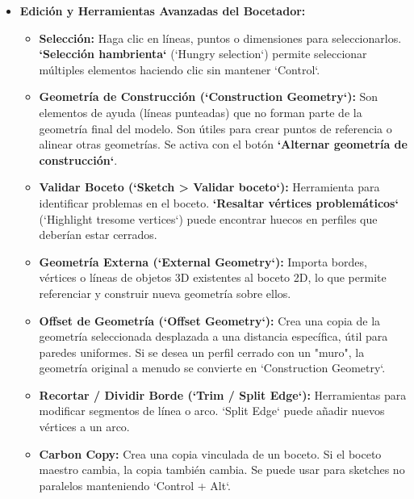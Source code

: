 \documentclass[12pt]{article}
\begin{document}
\begin{itemize}[label=\textbullet]

    \item \textbf{Edición y Herramientas Avanzadas del Bocetador:}
    \begin{itemize}[label=\textendash]
        \item \textbf{Selección:} Haga clic en líneas, puntos o dimensiones para seleccionarlos. \textbf{`Selección hambrienta`} (`Hungry selection`) permite seleccionar múltiples elementos haciendo clic sin mantener `Control`.
        \item \textbf{Geometría de Construcción (`Construction Geometry`):} Son elementos de ayuda (líneas punteadas) que no forman parte de la geometría final del modelo. Son útiles para crear puntos de referencia o alinear otras geometrías. Se activa con el botón \textbf{`Alternar geometría de construcción`}.
        \item \textbf{Validar Boceto (`Sketch > Validar boceto`):} Herramienta para identificar problemas en el boceto. \textbf{`Resaltar vértices problemáticos`} (`Highlight tresome vertices`) puede encontrar huecos en perfiles que deberían estar cerrados.
        \item \textbf{Geometría Externa (`External Geometry`):} Importa bordes, vértices o líneas de objetos 3D existentes al boceto 2D, lo que permite referenciar y construir nueva geometría sobre ellos.
        \item \textbf{Offset de Geometría (`Offset Geometry`):} Crea una copia de la geometría seleccionada desplazada a una distancia específica, útil para paredes uniformes. Si se desea un perfil cerrado con un "muro", la geometría original a menudo se convierte en `Construction Geometry`.
        \item \textbf{Recortar / Dividir Borde (`Trim / Split Edge`):} Herramientas para modificar segmentos de línea o arco. `Split Edge` puede añadir nuevos vértices a un arco.
        \item \textbf{Carbon Copy:} Crea una copia vinculada de un boceto. Si el boceto maestro cambia, la copia también cambia. Se puede usar para sketches no paralelos manteniendo `Control + Alt`.
    \end{itemize}
\end{itemize}
\end{document}
